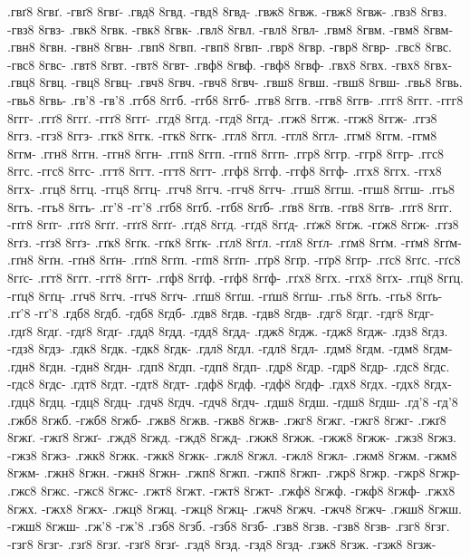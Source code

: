 {.гвґ8 8гвґ. -гвґ8 8гвґ-
.гвд8 8гвд. -гвд8 8гвд-
.гвж8 8гвж. -гвж8 8гвж-
.гвз8 8гвз. -гвз8 8гвз-
.гвк8 8гвк. -гвк8 8гвк-
.гвл8 8гвл. -гвл8 8гвл-
.гвм8 8гвм. -гвм8 8гвм-
.гвн8 8гвн. -гвн8 8гвн-
.гвп8 8гвп. -гвп8 8гвп-
.гвр8 8гвр. -гвр8 8гвр-
.гвс8 8гвс. -гвс8 8гвс-
.гвт8 8гвт. -гвт8 8гвт-
.гвф8 8гвф. -гвф8 8гвф-
.гвх8 8гвх. -гвх8 8гвх-
.гвц8 8гвц. -гвц8 8гвц-
.гвч8 8гвч. -гвч8 8гвч-
.гвш8 8гвш. -гвш8 8гвш-
.гвь8 8гвь. -гвь8 8гвь-
.гв'8 -гв'8
.ггб8 8ггб. -ггб8 8ггб-
.ггв8 8ггв. -ггв8 8ггв-
.ггг8 8ггг. -ггг8 8ггг-
.ггґ8 8ггґ. -ггґ8 8ггґ-
.ггд8 8ггд. -ггд8 8ггд-
.ггж8 8ггж. -ггж8 8ггж-
.ггз8 8ггз. -ггз8 8ггз-
.ггк8 8ггк. -ггк8 8ггк-
.ггл8 8ггл. -ггл8 8ггл-
.ггм8 8ггм. -ггм8 8ггм-
.ггн8 8ггн. -ггн8 8ггн-
.ггп8 8ггп. -ггп8 8ггп-
.ггр8 8ггр. -ггр8 8ггр-
.ггс8 8ггс. -ггс8 8ггс-
.ггт8 8ггт. -ггт8 8ггт-
.ггф8 8ггф. -ггф8 8ггф-
.ггх8 8ггх. -ггх8 8ггх-
.ггц8 8ггц. -ггц8 8ггц-
.ггч8 8ггч. -ггч8 8ггч-
.ггш8 8ггш. -ггш8 8ггш-
.ггь8 8ггь. -ггь8 8ггь-
.гг'8 -гг'8
.гґб8 8гґб. -гґб8 8гґб-
.гґв8 8гґв. -гґв8 8гґв-
.гґг8 8гґг. -гґг8 8гґг-
.гґґ8 8гґґ. -гґґ8 8гґґ-
.гґд8 8гґд. -гґд8 8гґд-
.гґж8 8гґж. -гґж8 8гґж-
.гґз8 8гґз. -гґз8 8гґз-
.гґк8 8гґк. -гґк8 8гґк-
.гґл8 8гґл. -гґл8 8гґл-
.гґм8 8гґм. -гґм8 8гґм-
.гґн8 8гґн. -гґн8 8гґн-
.гґп8 8гґп. -гґп8 8гґп-
.гґр8 8гґр. -гґр8 8гґр-
.гґс8 8гґс. -гґс8 8гґс-
.гґт8 8гґт. -гґт8 8гґт-
.гґф8 8гґф. -гґф8 8гґф-
.гґх8 8гґх. -гґх8 8гґх-
.гґц8 8гґц. -гґц8 8гґц-
.гґч8 8гґч. -гґч8 8гґч-
.гґш8 8гґш. -гґш8 8гґш-
.гґь8 8гґь. -гґь8 8гґь-
.гґ'8 -гґ'8
.гдб8 8гдб. -гдб8 8гдб-
.гдв8 8гдв. -гдв8 8гдв-
.гдг8 8гдг. -гдг8 8гдг-
.гдґ8 8гдґ. -гдґ8 8гдґ-
.гдд8 8гдд. -гдд8 8гдд-
.гдж8 8гдж. -гдж8 8гдж-
.гдз8 8гдз. -гдз8 8гдз-
.гдк8 8гдк. -гдк8 8гдк-
.гдл8 8гдл. -гдл8 8гдл-
.гдм8 8гдм. -гдм8 8гдм-
.гдн8 8гдн. -гдн8 8гдн-
.гдп8 8гдп. -гдп8 8гдп-
.гдр8 8гдр. -гдр8 8гдр-
.гдс8 8гдс. -гдс8 8гдс-
.гдт8 8гдт. -гдт8 8гдт-
.гдф8 8гдф. -гдф8 8гдф-
.гдх8 8гдх. -гдх8 8гдх-
.гдц8 8гдц. -гдц8 8гдц-
.гдч8 8гдч. -гдч8 8гдч-
.гдш8 8гдш. -гдш8 8гдш-
.гд'8 -гд'8
.гжб8 8гжб. -гжб8 8гжб-
.гжв8 8гжв. -гжв8 8гжв-
.гжг8 8гжг. -гжг8 8гжг-
.гжґ8 8гжґ. -гжґ8 8гжґ-
.гжд8 8гжд. -гжд8 8гжд-
.гжж8 8гжж. -гжж8 8гжж-
.гжз8 8гжз. -гжз8 8гжз-
.гжк8 8гжк. -гжк8 8гжк-
.гжл8 8гжл. -гжл8 8гжл-
.гжм8 8гжм. -гжм8 8гжм-
.гжн8 8гжн. -гжн8 8гжн-
.гжп8 8гжп. -гжп8 8гжп-
.гжр8 8гжр. -гжр8 8гжр-
.гжс8 8гжс. -гжс8 8гжс-
.гжт8 8гжт. -гжт8 8гжт-
.гжф8 8гжф. -гжф8 8гжф-
.гжх8 8гжх. -гжх8 8гжх-
.гжц8 8гжц. -гжц8 8гжц-
.гжч8 8гжч. -гжч8 8гжч-
.гжш8 8гжш. -гжш8 8гжш-
.гж'8 -гж'8
.гзб8 8гзб. -гзб8 8гзб-
.гзв8 8гзв. -гзв8 8гзв-
.гзг8 8гзг. -гзг8 8гзг-
.гзґ8 8гзґ. -гзґ8 8гзґ-
.гзд8 8гзд. -гзд8 8гзд-
.гзж8 8гзж. -гзж8 8гзж-
}
